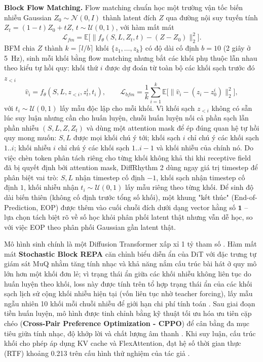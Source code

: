 \documentclass[a4paper,13pt,oneside]{report}
\begin{document}
\textbf{Block Flow Matching.} Flow matching chuẩn học một trường vận tốc biến nhiễu Gaussian $Z_0\sim\mathcal{N}(0,I)$ thành latent đích $Z$ qua đường nội suy tuyến tính $Z_t=(1-t)Z_0+tZ$, $t\sim\mathcal{U}(0,1)$, với hàm mất mát
\begin{equation}
 \mathcal{L}_{fm}=\mathbb{E}\big[\lVert f_\theta(S,L,Z_t,t)-(Z-Z_0)\rVert_2^2\big].
 \label{eq:diffrhythm2_fm}
\end{equation}
BFM chia $Z$ thành $k=\lceil l/b\rceil$ khối $\{z_1,\ldots,z_k\}$ có độ dài cố định $b=10$ (2 giây ở 5~Hz), sinh mỗi khối bằng flow matching nhưng bắt các khối phụ thuộc lẫn nhau theo kiểu tự hồi quy: khối thứ $i$ được dự đoán từ toàn bộ các khối sạch trước đó $z_{<i}$
\begin{equation}
 \hat v_i=f_\theta(S,L,z_{<i},z_t^i,t_i), \qquad
 \mathcal{L}_{bfm}=\frac{1}{k}\sum_{i=1}^{k}\mathbb{E}\big[\lVert \hat v_i-(z_i-z_0^i)\rVert_2^2\big],
 \label{eq:diffrhythm2_bfm}
\end{equation}
với $t_i\sim\mathcal{U}(0,1)$ lấy mẫu độc lập cho mỗi khối. Vì khối sạch $z_{<i}$ không có sẵn lúc suy luận nhưng cần cho huấn luyện, chuỗi huấn luyện nối cả phần sạch lẫn phần nhiễu $(S,L,Z,Z_t)$ và dùng một attention mask để ép đúng quan hệ tự hồi quy mong muốn: $S,L$ được mọi khối chú ý tới; khối sạch $i$ chỉ chú ý các khối sạch $1..i$; khối nhiễu $i$ chỉ chú ý các khối sạch $1..i-1$ và khối nhiễu của chính nó. Do việc chèn token phân tách riêng cho từng khối không khả thi khi receptive field đã bị quyết định bởi attention mask, DiffRhythm 2 dùng ngay giá trị timestep để phân biệt vai trò: $S,L$ nhận timestep cố định $-1$, khối sạch nhận timestep cố định $1$, khối nhiễu nhận $t_i\sim\mathcal{U}(0,1)$ lấy mẫu riêng theo từng khối. Để sinh độ dài biến thiên (không cố định trước tổng số khối), một khung "kết thúc" (End-of-Prediction, EOP) được thêm vào cuối chuỗi đích dưới dạng vector hằng số $\mathbf{1}$ -- lựa chọn tách biệt rõ về số học khỏi phân phối latent thật nhưng vẫn dễ học, so với việc EOP theo phân phối Gaussian gần latent thật.

Mô hình sinh chính là một Diffusion Transformer xấp xỉ 1 tỷ tham số \cite{dit, diffrhythm2}. Hàm mất mát \textbf{Stochastic Block REPA} căn chỉnh biểu diễn ẩn của DiT với đặc trưng tự giám sát MuQ \cite{muq} nhằm tăng tính nhạc và khả năng nắm cấu trúc bài hát ở quy mô lớn hơn một khối đơn lẻ; vì trạng thái ẩn giữa các khối nhiễu không liên tục do huấn luyện theo khối, loss này được tính trên tổ hợp trạng thái ẩn của các khối sạch lịch sử cộng khối nhiễu hiện tại (vốn liên tục nhờ teacher forcing), lấy mẫu ngẫu nhiên 10 khối mỗi chuỗi nhiễu để giới hạn chi phí tính toán \cite{diffrhythm2}. Sau giai đoạn tiền huấn luyện, mô hình được tinh chỉnh bằng kỹ thuật tối ưu hóa ưu tiên cặp chéo (\textbf{Cross-Pair Preference Optimization - CPPO}) để cân bằng đa mục tiêu giữa tính nhạc, độ khớp lời và chất lượng âm thanh \cite{dpo, diffrhythm2}. Khi suy luận, cấu trúc khối cho phép áp dụng KV cache và FlexAttention, đạt hệ số thời gian thực (RTF) khoảng 0.213 trên cấu hình thử nghiệm của tác giả \cite{diffrhythm2}.
\end{document}
